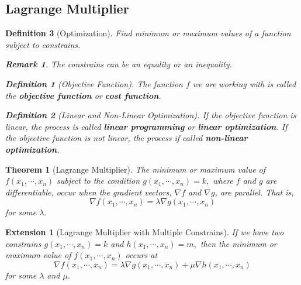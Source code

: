 \documentclass[12pt,a4paper]{article}
\newtheorem{thm}{Theorem}[subsection]
\newtheorem{df}{Definition}[subsection]
\newtheorem*{rmk}{\indent Remark}
\newtheorem*{ext}{\indent Extension}
\begin{document}
\subsection{Lagrange Multiplier}
\begin{df}[Optimization]
	Find minimum or maximum values of a function subject to constrains.
	\begin{rmk} The constrains can be an equality or an inequality. \end{rmk}
	\begin{df}[Objective Function]
		The function $f$ we are working with is called the \textbf{objective function} or \textbf{cost function}.
	\end{df}	
	\begin{df}[Linear and Non-Linear Optimization]
		If the objective function is linear, the process is called \textbf{linear programming} or \textbf{linear optimization}. If the objective function is not linear, the process if called \textbf{non-linear optimization}.
	\end{df}
\end{df}
\begin{thm}[Lagrange Multiplier]
	The minimum or maximum value of $f(x_1,\cdots, x_n)$ subject to the condition $g(x_1,\cdots,x_n)=k,$ where $f$ and $g$ are differentiable, occur when the gradient vectors, $\nabla f$ and $\nabla g$, are parallel. That is, \[\nabla f(x_1,\cdots, x_n)=\lambda\nabla g(x_1,\cdots,x_n)\]	for some $\lambda.$
\end{thm}
\begin{ext}[Lagrange Multiplier with Multiple Constrains]
	If we have two constrains $g(x_1,\cdots,x_n)=k$ and $h(x_1,\cdots,x_n)=m,$ then the minimum or maximum value of $f(x_1,\cdots,x_n)$ occurs at \[\nabla f(x_1,\cdots,x_n)=\lambda\nabla g(x_1,\cdots, x_n)+\mu\nabla h(x_1,\cdots,x_n)\] for some $\lambda$ and $\mu.$
\end{ext}
\end{document}
